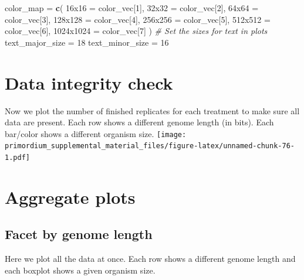 \documentclass[
]{book}
\newenvironment{Shaded}{\begin{snugshade}}{\end{snugshade}}
\newcommand{\CommentTok}[1]{\textcolor[rgb]{0.56,0.35,0.01}{\textit{#1}}}
\newcommand{\DecValTok}[1]{\textcolor[rgb]{0.00,0.00,0.81}{#1}}
\newcommand{\KeywordTok}[1]{\textcolor[rgb]{0.13,0.29,0.53}{\textbf{#1}}}
\newcommand{\NormalTok}[1]{#1}
\newcommand{\StringTok}[1]{\textcolor[rgb]{0.31,0.60,0.02}{#1}}
\begin{document}
\begin{Shaded}
\begin{Highlighting}[]
\NormalTok{color\_map =}\StringTok{ }\KeywordTok{c}\NormalTok{(}
  \StringTok{\textquotesingle{}16x16\textquotesingle{}}\NormalTok{ =}\StringTok{     }\NormalTok{color\_vec[}\DecValTok{1}\NormalTok{],}
  \StringTok{\textquotesingle{}32x32\textquotesingle{}}\NormalTok{ =}\StringTok{     }\NormalTok{color\_vec[}\DecValTok{2}\NormalTok{],}
  \StringTok{\textquotesingle{}64x64\textquotesingle{}}\NormalTok{ =}\StringTok{     }\NormalTok{color\_vec[}\DecValTok{3}\NormalTok{],}
  \StringTok{\textquotesingle{}128x128\textquotesingle{}}\NormalTok{ =}\StringTok{   }\NormalTok{color\_vec[}\DecValTok{4}\NormalTok{],}
  \StringTok{\textquotesingle{}256x256\textquotesingle{}}\NormalTok{ =}\StringTok{   }\NormalTok{color\_vec[}\DecValTok{5}\NormalTok{],}
  \StringTok{\textquotesingle{}512x512\textquotesingle{}}\NormalTok{ =}\StringTok{   }\NormalTok{color\_vec[}\DecValTok{6}\NormalTok{],}
  \StringTok{\textquotesingle{}1024x1024\textquotesingle{}}\NormalTok{ =}\StringTok{ }\NormalTok{color\_vec[}\DecValTok{7}\NormalTok{]}
\NormalTok{)}
\CommentTok{\# Set the sizes for text in plots}
\NormalTok{text\_major\_size =}\StringTok{ }\DecValTok{18}
\NormalTok{text\_minor\_size =}\StringTok{ }\DecValTok{16} 
\end{Highlighting}
\end{Shaded}

\hypertarget{data-integrity-check-5}{%
\section{Data integrity check}\label{data-integrity-check-5}}

Now we plot the number of finished replicates for each treatment to make sure all data are present.
Each row shows a different genome length (in bits).
Each bar/color shows a different organism size.
\texttt{[image: primordium\_supplemental\_material\_files/figure-latex/unnamed-chunk-76-1.pdf]}

\hypertarget{aggregate-plots-3}{%
\section{Aggregate plots}\label{aggregate-plots-3}}

\hypertarget{facet-by-genome-length}{%
\subsection{Facet by genome length}\label{facet-by-genome-length}}

Here we plot all the data at once.
Each row shows a different genome length and each boxplot shows a given organism size.
\end{document}
